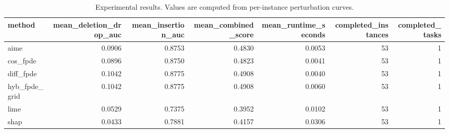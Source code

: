 \begin{table}[t]
\caption{Experimental results. Values are computed from per-instance perturbation curves.}
\label{tab:main_results_computed}
\centering
\begin{tabular}{lrrrrrr}
\toprule
method & mean\_deletion\_drop\_auc & mean\_insertion\_auc & mean\_combined\_score & mean\_runtime\_seconds & completed\_instances & completed\_tasks \\
\midrule
aime & 0.0906 & 0.8753 & 0.4830 & 0.0053 & 53 & 1 \\
cos\_fpde & 0.0896 & 0.8750 & 0.4823 & 0.0041 & 53 & 1 \\
diff\_fpde & 0.1042 & 0.8775 & 0.4908 & 0.0040 & 53 & 1 \\
hyb\_fpde\_grid & 0.1042 & 0.8775 & 0.4908 & 0.0060 & 53 & 1 \\
lime & 0.0529 & 0.7375 & 0.3952 & 0.0102 & 53 & 1 \\
shap & 0.0433 & 0.7881 & 0.4157 & 0.0306 & 53 & 1 \\
\bottomrule
\end{tabular}

\end{table}
